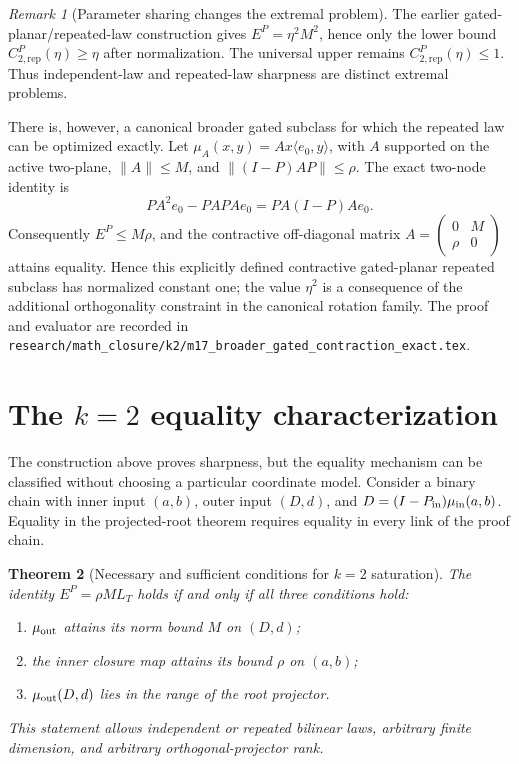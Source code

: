 \documentclass[11pt]{amsart}
\newtheorem{theorem}{Theorem}[section]
\theoremstyle{definition}
\theoremstyle{remark}
\newtheorem{remark}[theorem]{Remark}
\begin{document}
\begin{remark}[Parameter sharing changes the extremal problem]
The earlier gated-planar/repeated-law construction gives
$E^P=\eta^2M^2$, hence only the lower bound
$C_{2,\mathrm{rep}}^P(\eta)\ge\eta$ after normalization. The universal
upper remains $C_{2,\mathrm{rep}}^P(\eta)\le1$. Thus independent-law and
repeated-law sharpness are distinct extremal problems.
\end{remark}

There is, however, a canonical broader gated subclass for which the repeated
law can be optimized exactly. Let
$\mu_A(x,y)=Ax\langle e_0,y\rangle$, with $A$ supported on the active
two-plane, $\|A\|\le M$, and $\|(I-P)AP\|\le\rho$. The exact two-node
identity is
\[
 P A^2e_0-PAPAe_0=PA(I-P)Ae_0.
\]
Consequently $E^P\le M\rho$, and the contractive off-diagonal matrix
$A=\left(\begin{smallmatrix}0&M\\\rho&0\end{smallmatrix}\right)$ attains
equality. Hence this explicitly defined contractive gated-planar repeated
subclass has normalized constant one; the value $\eta^2$ is a consequence of
the additional orthogonality constraint in the canonical rotation family.
The proof and evaluator are recorded in
\texttt{research/math\_closure/k2/m17\_broader\_gated\_contraction\_exact.tex}.

\section{The $k=2$ equality characterization}

The construction above proves sharpness, but the equality mechanism can be
classified without choosing a particular coordinate model. Consider a binary
chain with inner input $(a,b)$, outer input $(D,d)$, and
$D=(I-P_{\rm in})\mu_{\rm in}(a,b)$. Equality in the projected-root theorem
requires equality in every link of the proof chain.

\begin{theorem}[Necessary and sufficient conditions for $k=2$ saturation]
\label{thm:k2iff}
The identity $E^P=\rho M L_T$ holds if and only if all three conditions hold:
\begin{enumerate}
  \item[(EQ1)] $\mu_{\rm out}$ attains its norm bound $M$ on $(D,d)$;
  \item[(EQ2)] the inner closure map attains its bound $\rho$ on $(a,b)$;
  \item[(EQ3)] $\mu_{\rm out}(D,d)$ lies in the range of the root projector.
\end{enumerate}
This statement allows independent or repeated bilinear laws, arbitrary finite
dimension, and arbitrary orthogonal-projector rank.
\end{theorem}
\end{document}
